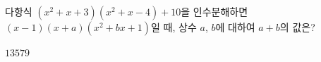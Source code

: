 다항식 $(x^2+x+3)(x^2+x-4)+10$을 인수분해하면 $(x-1)(x+a)(x^2+bx+1)$일 때, 상수 $a$, $b$에 대하여 $a+b$의 값은?
\begin{choices32}{$1$}{$3$}{$5$}{$7$}{$9$}\end{choices32}
